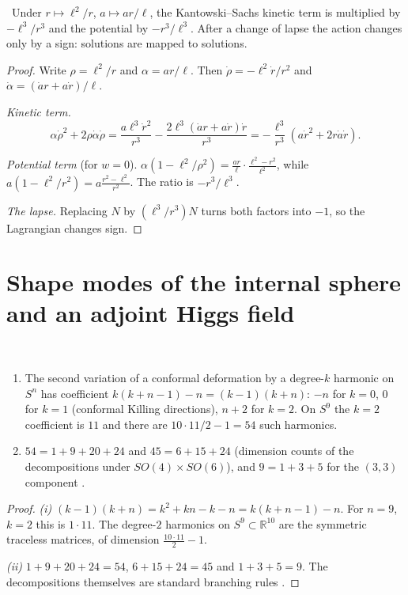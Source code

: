 \begin{proposition}\label{prop:inversion}\ver\
Under $r\mapsto\ell^2/r$, $a\mapsto ar/\ell$, the Kantowski--Sachs kinetic term is multiplied by $-\ell^3/r^3$ and the potential by $-r^3/\ell^3$. After a change of lapse the action changes only by a sign: solutions are mapped to solutions.
\end{proposition}
\begin{proof}
Write $\rho=\ell^2/r$ and $\alpha=ar/\ell$. Then $\dot\rho=-\ell^2\dot r/r^2$ and $\dot\alpha=(\dot ar+a\dot r)/\ell$.

\emph{Kinetic term.}
\[
\alpha\dot\rho^2+2\rho\dot\alpha\dot\rho=\frac{a\ell^3\dot r^2}{r^3}-\frac{2\ell^3(\dot ar+a\dot r)\dot r}{r^3}=-\frac{\ell^3}{r^3}(a\dot r^2+2r\dot a\dot r).
\]

\emph{Potential term} (for $w=0$). $\alpha(1-\ell^2/\rho^2)=\frac{ar}\ell\cdot\frac{\ell^2-r^2}{\ell^2}$, while $a(1-\ell^2/r^2)=a\frac{r^2-\ell^2}{r^2}$. The ratio is $-r^3/\ell^3$.

\emph{The lapse.} Replacing $N$ by $(\ell^3/r^3)N$ turns both factors into $-1$, so the Lagrangian changes sign.
\end{proof}


\section[Shape modes and an adjoint Higgs field]{Shape modes of the internal sphere and an adjoint Higgs field}

\begin{proposition}\label{prop:s9shape}\ver\
\begin{enumerate}[label=(\roman*)]
\item The second variation of a conformal deformation by a degree-$k$ harmonic on $S^n$ has coefficient $k(k+n-1)-n=(k-1)(k+n)$: $-n$ for $k=0$, $0$ for $k=1$ (conformal Killing directions), $n+2$ for $k=2$. On $S^9$ the $k=2$ coefficient is $11$ and there are $10\cdot11/2-1=54$ such harmonics.
\item $54=1+9+20+24$ and $45=6+15+24$ (dimension counts of the decompositions under $SO(4)\times SO(6)$), and $9=1+3+5$ for the $(3,3)$ component \ext.
\end{enumerate}
\end{proposition}
\begin{proof}
\emph{(i)} $(k-1)(k+n)=k^2+kn-k-n=k(k+n-1)-n$. For $n=9$, $k=2$ this is $1\cdot11$. The degree-$2$ harmonics on $S^9\subset\mathbb R^{10}$ are the symmetric traceless matrices, of dimension $\frac{10\cdot11}2-1$.

\emph{(ii)} $1+9+20+24=54$, $6+15+24=45$ and $1+3+5=9$. The decompositions themselves are standard branching rules \ext.
\end{proof}


